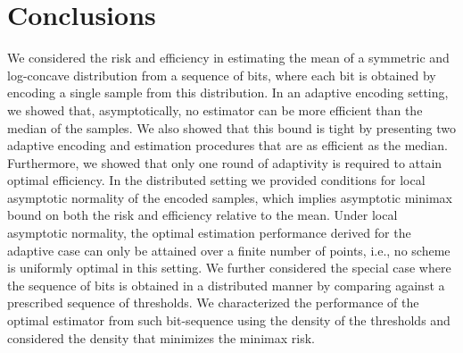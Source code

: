 \section{Conclusions \label{sec:conclusions}}
We considered the risk and efficiency in estimating the mean of a symmetric and log-concave distribution from a sequence of bits, where each bit is obtained by encoding a single sample from this distribution. 
%
In an adaptive encoding setting, we showed that, asymptotically, no estimator can be more efficient than the median of the samples. We also showed that this bound is tight by presenting two adaptive encoding and estimation procedures that are as efficient as the median. Furthermore, we showed that only one round of adaptivity is required to attain optimal efficiency. In the distributed setting we provided conditions for local asymptotic normality of the encoded samples, which implies asymptotic minimax bound on both the risk and efficiency relative to the mean. 
%
Under local asymptotic normality, the optimal estimation performance derived for the adaptive case can only be attained over a finite number of points, i.e., no scheme is uniformly optimal in this setting. 
%
We further considered the special case where the sequence of bits is obtained in a distributed manner by comparing against a prescribed sequence of thresholds. We characterized the performance of the optimal estimator from such bit-sequence using the density of the thresholds and considered the density that minimizes the minimax risk. 
%
